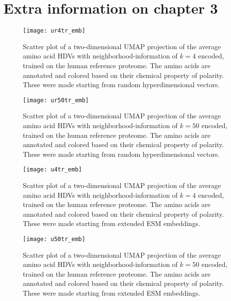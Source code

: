\chapter{Extra information on chapter 3}\label{app:chp3}
\begin{figure}[H]
    \centering
    \texttt{[image: ur4tr\_emb]}
    \caption{Scatter plot of a two-dimensional UMAP projection of the average amino acid HDVs with neighborhood-information of $k = 4$ encoded, trained on the human reference proteome. The amino acids are annotated and colored based on their chemical property of polarity. These were made starting from random hyperdimensional vectors.}
    \label{fig:AAtr4ru}
\end{figure}
\begin{figure}[H]
    \centering
    \texttt{[image: ur50tr\_emb]}
    \caption{Scatter plot of a two-dimensional UMAP projection of the average amino acid HDVs with neighborhood-information of $k = 50$ encoded, trained on the human reference proteome. The amino acids are annotated and colored based on their chemical property of polarity. These were made starting from random hyperdimensional vectors.}
    \label{fig:AAtr50ru}
\end{figure}
\begin{figure}[H]
    \centering
    \texttt{[image: u4tr\_emb]}
    \caption{Scatter plot of a two-dimensional UMAP projection of the average amino acid HDVs with neighborhood-information of $k = 4$ encoded, trained on the human reference proteome. The amino acids are annotated and colored based on their chemical property of polarity. These were made starting from extended ESM embeddings.}
    \label{fig:AAtr4u}
\end{figure}
\begin{figure}[H]
    \centering
    \texttt{[image: u50tr\_emb]}
    \caption{Scatter plot of a two-dimensional UMAP projection of the average amino acid HDVs with neighborhood-information of $k = 50$ encoded, trained on the human reference proteome. The amino acids are annotated and colored based on their chemical property of polarity. These were made starting from extended ESM embeddings.}
    \label{fig:AAtr50u}
\end{figure}